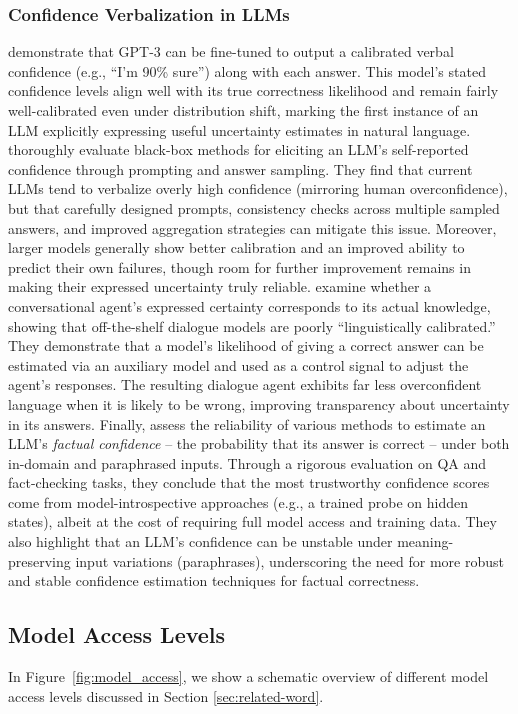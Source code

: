 \subsubsection{Confidence Verbalization in LLMs}
\citet{lin2022teaching} demonstrate that GPT-3 can be fine-tuned to output a calibrated verbal confidence (e.g., ``I’m 90\% sure'') along with each answer. This model’s stated confidence levels align well with its true correctness likelihood and remain fairly well-calibrated even under distribution shift, marking the first instance of an LLM explicitly expressing useful uncertainty estimates in natural language. \citet{xiong2024can} thoroughly evaluate black-box methods for eliciting an LLM’s self-reported confidence through prompting and answer sampling. They find that current LLMs tend to verbalize overly high confidence (mirroring human overconfidence), but that carefully designed prompts, consistency checks across multiple sampled answers, and improved aggregation strategies can mitigate this issue. Moreover, larger models generally show better calibration and an improved ability to predict their own failures, though room for further improvement remains in making their expressed uncertainty truly reliable. \citet{mielke2022reducing} examine whether a conversational agent’s expressed certainty corresponds to its actual knowledge, showing that off-the-shelf dialogue models are poorly “linguistically calibrated.” They demonstrate that a model’s likelihood of giving a correct answer can be estimated via an auxiliary model and used as a control signal to adjust the agent’s responses. The resulting dialogue agent exhibits far less overconfident language when it is likely to be wrong, improving transparency about uncertainty in its answers. Finally, \citet{mahaut2024factual} assess the reliability of various methods to estimate an LLM’s \emph{factual confidence} – the probability that its answer is correct – under both in-domain and paraphrased inputs. Through a rigorous evaluation on QA and fact-checking tasks, they conclude that the most trustworthy confidence scores come from model-introspective approaches (e.g., a trained probe on hidden states), albeit at the cost of requiring full model access and training data. They also highlight that an LLM’s confidence can be unstable under meaning-preserving input variations (paraphrases), underscoring the need for more robust and stable confidence estimation techniques for factual correctness.

\subsection{Model Access Levels} In Figure~\ref{fig:model_access}, we show a schematic overview of different model access levels discussed in Section \ref{sec:related-word}.

